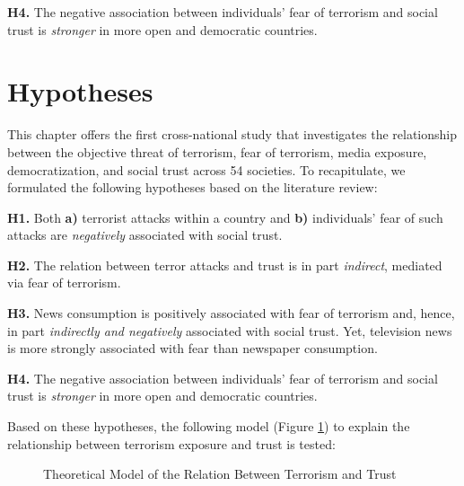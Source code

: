 \vspace{4mm}
\noindent\textbf{H4.} The negative association between individuals’ fear of terrorism and social trust is \textit{stronger} in more open and democratic countries.


\section{Hypotheses}

This chapter offers the first cross-national study that investigates the relationship between the objective threat of terrorism, fear of terrorism, media exposure, democratization, and social trust across 54 societies. To recapitulate, we formulated the following hypotheses based on the literature review:

\vspace{2mm}
\noindent\textbf{H1.} Both \textbf{a)} terrorist attacks within a country and \textbf{b)} individuals’ fear of such attacks are
\textit{negatively} associated with social trust.

\vspace{2mm}
\noindent\textbf{H2.} The relation between terror attacks and trust is in part \textit{indirect}, mediated via fear of terrorism.

\vspace{2mm}
\noindent\textbf{H3.} News consumption is positively associated with fear of terrorism and, hence, in part\textit{ indirectly and negatively} associated with social trust. Yet, television news is more strongly associated with fear than newspaper consumption.

\vspace{2mm}
\noindent\textbf{H4.} The negative association between individuals’ fear of terrorism and social trust is \textit{stronger} in more open and democratic countries.

\newpage
Based on these hypotheses, the following model (Figure \ref{fig:art1-model}) to explain the relationship
between terrorism exposure and trust is tested:

\vspace{3mm}
\begin{figure}[h!]
\centering
{}
\caption{Theoretical Model of the Relation Between Terrorism and Trust}
\label{fig:art1-model}    
\end{figure}


